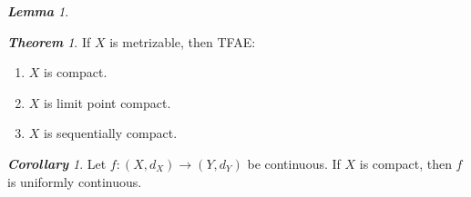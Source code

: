 \documentclass[frenchspacing,9pt,landscape,a4paper]{article}
\theoremstyle{remark}
\newtheorem*{thm}{\textbf{Theorem}}
\newtheorem*{lem}{\textbf{Lemma}}
\newtheorem*{cor}{\textbf{Corollary}}
\begin{document}
\begin{multicols}{4}
\begin{lem}
\end{lem}
\begin{thm}
    If $X$ is metrizable, then TFAE:
     \begin{enumerate}
         \item $X$ is compact.
         \item  $X$ is limit point compact.
         \item  $X$ is sequentially compact.
    \end{enumerate}
\end{thm}
\begin{cor}
    Let $f:(X,d_X)\to(Y,d_Y)$ be continuous. If  $X$ is compact, then  $f$ is uniformly continuous.
\end{cor}

\end{multicols}
\end{document}

